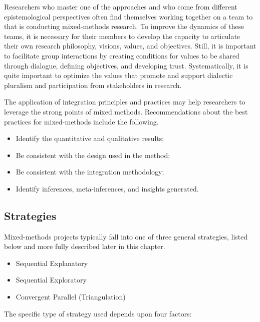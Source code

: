 Researchers who master one of the approaches and who come from different epistemological perspectives often find themselves working together on a team to that is conducting mixed-methods research. To improve the dynamics of these teams, it is necessary for their members to develop the capacity to articulate their own research philosophy, visions, values, and objectives. Still, it is important to facilitate group interactions by creating conditions for values to be shared through dialogue, defining objectives, and developing trust. Systematically, it is quite important to optimize the values that promote and support dialectic pluralism and participation from stakeholders in research.

The application of integration principles and practices may help researchers to leverage the strong points of mixed methods. Recommendations about the best practices for mixed-methods include the following.

\begin{itemize}
	\item Identify the quantitative and qualitative results;
	\item Be consistent with the design used in the method;
	\item Be consistent with the integration methodology;
	\item Identify inferences, meta-inferences, and insights generated.
\end{itemize}


\subsection{Strategies}

Mixed-methods projects typically fall into one of three general strategies, listed below and more fully described later in this chapter.

\begin{itemize}
	\item Sequential Explanatory
	\item Sequential Exploratory
	\item Convergent Parallel (Triangulation)
\end{itemize}

The specific type of strategy used depends upon four factors:

